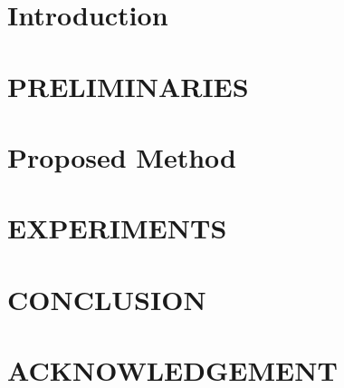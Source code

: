 \documentclass[10pt]{jarticle}
\begin{document}
\maketitle



\section{Introduction}\label{sec:Introduction}


\clearpage

\section{PRELIMINARIES}\label{sec:Preliminaries}


\section{Proposed Method}\label{sec:ProposedMethod}



\section{EXPERIMENTS}\label{sec:Experiments}


\section{CONCLUSION}\label{sec:Conclusion}


\section{ACKNOWLEDGEMENT}\label{sec:Acknowledgement}


\clearpage

\begin{spacing}{0.85}
    
    \small
    \setlength{\itemsep}{0pt}
    
\end{spacing}

\end{document}
